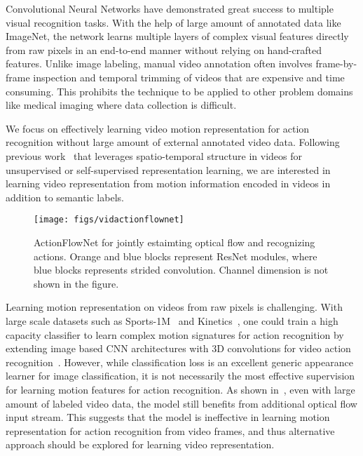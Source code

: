 \documentclass[10pt,twocolumn,letterpaper]{article}
\begin{document}
Convolutional Neural Networks have demonstrated great success to multiple visual recognition tasks.
With the help of large amount of annotated data like ImageNet, the network learns multiple layers of complex visual features directly from raw pixels in an end-to-end manner without relying on hand-crafted features. 
Unlike image labeling, manual video annotation often involves frame-by-frame inspection and temporal trimming of videos that are expensive and time consuming. 
This prohibits the technique to be applied to other problem domains like medical imaging where data collection is difficult.

We focus on effectively learning video motion representation for action recognition without large amount of external annotated video data.
Following previous work~\cite{misra2016shuffle,vondrick2016generating,fernando2016self} that leverages spatio-temporal structure in videos for unsupervised or self-supervised representation learning, we are interested in learning video representation from motion information encoded in videos in addition to semantic labels.









\begin{figure}[h!]
  \vspace{-1em}
\centering
\texttt{[image: figs/vidactionflownet]}	
  \caption{ActionFlowNet for jointly estaimting optical flow and recognizing actions. Orange and blue blocks represent ResNet modules, where blue blocks represents strided convolution. Channel dimension is not shown in the figure.}
	\label{fig:vid_afn}
  \vspace{-1em}
\end{figure}



Learning motion representation on videos from raw pixels is challenging.
With large scale datasets such as Sports-1M~\cite{karpathyTSLSF14} and Kinetics~\cite{kay2017kinetics}, one could train a high capacity classifier to learn complex motion signatures for action recognition by extending image based CNN architectures with 3D convolutions for video action recognition~\cite{karpathyTSLSF14,tranBFTP15,carreira2017quo}.
However, while classification loss is an excellent generic appearance learner for image classification, it is not necessarily the most effective supervision for learning motion features for action recognition.
As shown in~\cite{carreira2017quo}, even with large amount of labeled video data, the model still benefits from additional optical flow input stream. This suggests that the model is ineffective in learning motion representation for action recognition from video frames, and thus alternative approach should be explored for learning video representation.
\end{document}
